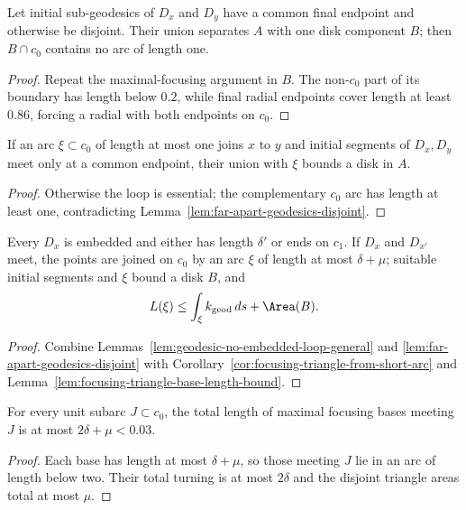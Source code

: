 \begin{lemma}
\label{lem:far-apart-geodesics-disjoint}
Let initial sub-geodesics of $D_x$ and $D_y$ have a common final endpoint and
otherwise be disjoint. Their union separates $A$ with one disk component $B$;
then $B\cap c_0$ contains no arc of length one.
\end{lemma}
\begin{proof}
\sketch Repeat the maximal-focusing argument in $B$. The non-$c_0$ part of its boundary
has length below $0.2$, while final radial endpoints cover length at least
$0.86$, forcing a radial with both endpoints on $c_0$.
\end{proof}

\begin{corollary}
\label{cor:focusing-triangle-from-short-arc}
\label{noholes}
If an arc $\xi\subset c_0$ of length at most one joins $x$ to $y$ and initial
segments of $D_x,D_y$ meet only at a common endpoint, their union with $\xi$
bounds a disk in $A$.
\end{corollary}
\begin{proof}
\sketch Otherwise the loop is essential; the complementary $c_0$ arc has length at
least one, contradicting Lemma~\ref{lem:far-apart-geodesics-disjoint}.
\end{proof}

\begin{corollary}
\label{cor:geodesic-family-intersection-summary}
\label{focussummary}
Every $D_x$ is embedded and either has length $\delta'$ or ends on $c_1$. If
$D_x$ and $D_{x'}$ meet, the points are joined on $c_0$ by an arc $\xi$ of
length at most $\delta+\mu$; suitable initial segments and $\xi$ bound a disk
$B$, and
\[
L(\xi)\le\int_\xi k_{\mathrm{geod}}\,ds+\Area(B).
\]
\end{corollary}
\begin{proof}
\sketch Combine Lemmas~\ref{lem:geodesic-no-embedded-loop-general} and
\ref{lem:far-apart-geodesics-disjoint} with
Corollary~\ref{cor:focusing-triangle-from-short-arc} and
Lemma~\ref{lem:focusing-triangle-base-length-bound}.
\end{proof}

\begin{claim}
\label{claim:focusing-triangle-total-base-length-bound}
For every unit subarc $J\subset c_0$, the total length of maximal focusing
bases meeting $J$ is at most $2\delta+\mu<0.03$.
\end{claim}
\begin{proof}
\sketch Each base has length at most $\delta+\mu$, so those meeting $J$ lie in an arc
of length below two. Their total turning is at most $2\delta$ and the disjoint
triangle areas total at most $\mu$.
\end{proof}

